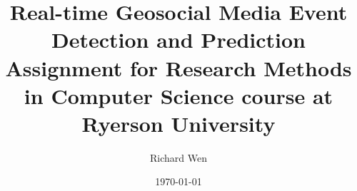



\title{Real-time Geosocial Media Event Detection and Prediction \\ \linespread{2} \footnotesize Assignment for Research Methods in Computer Science course at Ryerson University}
\author{Richard Wen}
\date{\footnotesize \today}

\maketitle

